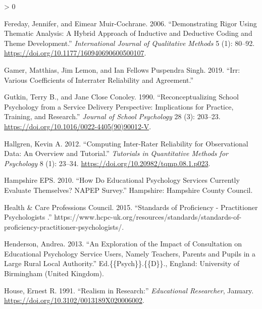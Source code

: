 \documentclass[
]{article}
\newlength{\cslhangindent}
\newenvironment{CSLReferences}[2] %
 {%
  \setlength{\parindent}{0pt}
  \ifodd #1 \everypar{\setlength{\hangindent}{\cslhangindent}}\ignorespaces\fi
  \ifnum #2 > 0
  \setlength{\parskip}{#2\baselineskip}
  \fi
 }%
 {}
\begin{document}
\begin{CSLReferences}{1}{0}
\leavevmode\hypertarget{ref-feredayDemonstratingRigorUsing2006}{}%
Fereday, Jennifer, and Eimear Muir-Cochrane. 2006. {``Demonstrating
{Rigor Using Thematic Analysis}: {A Hybrid Approach} of {Inductive} and
{Deductive Coding} and {Theme Development}.''} \emph{International
Journal of Qualitative Methods} 5 (1): 80--92.
\url{https://doi.org/10.1177/160940690600500107}.

\leavevmode\hypertarget{ref-gamerIrrVariousCoefficients2019}{}%
Gamer, Matthias, Jim Lemon, and Ian Fellows Puspendra Singh. 2019.
{``Irr: {Various Coefficients} of {Interrater Reliability} and
{Agreement}.''}

\leavevmode\hypertarget{ref-gutkinReconceptualizingSchoolPsychology1990}{}%
Gutkin, Terry B., and Jane Close Conoley. 1990. {``Reconceptualizing
School Psychology from a Service Delivery Perspective: {Implications}
for Practice, Training, and Research.''} \emph{Journal of School
Psychology} 28 (3): 203--23.
\url{https://doi.org/10.1016/0022-4405(90)90012-V}.

\leavevmode\hypertarget{ref-hallgrenComputingInterRaterReliability2012}{}%
Hallgren, Kevin A. 2012. {``Computing {Inter}-{Rater Reliability} for
{Observational Data}: {An Overview} and {Tutorial}.''} \emph{Tutorials
in Quantitative Methods for Psychology} 8 (1): 23--34.
\url{https://doi.org/10.20982/tqmp.08.1.p023}.

\leavevmode\hypertarget{ref-hampshireepsHowEducationalPsychology2010}{}%
Hampshire EPS. 2010. {``How Do Educational Psychology Services Currently
Evaluate Themselves? {NAPEP} Survey.''} {Hampshire: Hampshire County
Council}.

\leavevmode\hypertarget{ref-healthcareprofessionscouncilStandardsProficiencyPractitioner2015a}{}%
Health \& Care Professions Council. 2015. {``Standards of Proficiency -
{Practitioner} Psychologists \textbar{}.''}
https://www.hcpc-uk.org/resources/standards/standards-of-proficiency-practitioner-psychologists/.

\leavevmode\hypertarget{ref-hendersonExplorationImpactConsultation2013}{}%
Henderson, Andrea. 2013. {``An Exploration of the Impact of Consultation
on Educational Psychology Service Users, Namely Teachers, Parents and
Pupils in a Large Rural Local Authority.''} Ed.\{\{Psych\}\}.\{\{D\}\}.,
{England}: University of Birmingham (United Kingdom).

\leavevmode\hypertarget{ref-houseRealismResearch1991}{}%
House, Ernest R. 1991. {``Realism in {Research}:''} \emph{Educational
Researcher}, January. \url{https://doi.org/10.3102/0013189X020006002}.


\end{CSLReferences}
\end{document}
